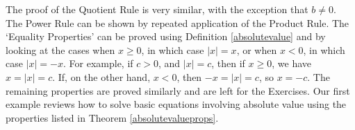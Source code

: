 \smallskip

The proof of the Quotient Rule is very similar, with the exception that $b \neq 0$. The Power Rule can be shown by repeated application of the Product Rule.  The `Equality Properties' can be proved using Definition \ref{absolutevalue} and by looking at the cases when $x\geq 0$, in which case $|x| = x$, or when $x<0$, in which case $|x| = -x$.  For example, if $c>0$, and $|x| = c$, then if $x \geq 0$, we have $x = |x| = c$.  If, on the other hand, $x < 0$, then $-x = |x| = c$, so $x = -c$.  The remaining properties are proved similarly and are left for the Exercises.  Our first example reviews how to solve basic equations involving absolute value using the properties listed in Theorem \ref{absolutevalueprops}.

\medskip

